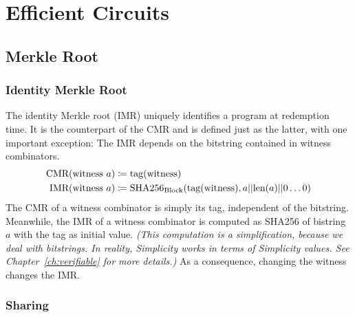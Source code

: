 \chapter{Efficient Circuits}


\section{Merkle Root}

\subsection{Identity Merkle Root}

The identity Merkle root (IMR) uniquely identifies a program at redemption time.
It is the counterpart of the CMR and is defined just as the latter,
with one important exception:
The IMR depends on the bitstring contained in witness combinators.
%
\begin{align*}
    \text{CMR}(\text{witness}\ a) &\coloneqq \text{tag}(\text{witness}) \\
    \text{IMR}(\text{witness}\ a) &\coloneqq \text{SHA256}_\text{Block}(\text{tag}(\text{witness}), a || \text{len}(a) || 0\ldots0)
\end{align*}
%
The CMR of a witness combinator is simply its tag,
independent of the bitstring.
Meanwhile,
the IMR of a witness combinator is computed as SHA256 of bistring $a$ with the tag as initial value.
\emph{(This computation is a simplification, because we deal with bitstrings.
In reality, Simplicity works in terms of Simplicity values. See Chapter~\ref{ch:verifiable} for more details.)}
As a consequence,
changing the witness changes the IMR.

\subsection{Sharing}

